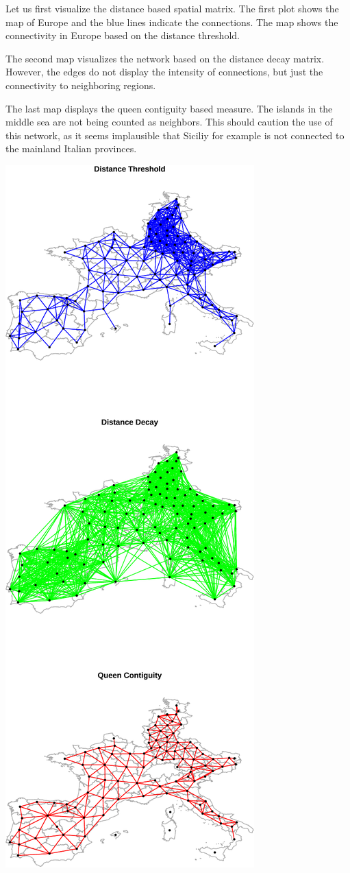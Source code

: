 \documentclass[
  a4paper,
]{article}
\begin{document}
Let us first visualize the distance based spatial matrix. The first plot
shows the map of Europe and the blue lines indicate the connections. The
map shows the connectivity in Europe based on the distance threshold.

The second map visualizes the network based on the distance decay
matrix. However, the edges do not display the intensity of connections,
but just the connectivity to neighboring regions.

The last map displays the queen contiguity based measure. The islands in
the middle sea are not being counted as neighbors. This should caution
the use of this network, as it seems implausible that Siciliy for
example is not connected to the mainland Italian provinces.

\begin{center}\includegraphics{02_assignmnet_files/figure-latex/unnamed-chunk-9-1} \end{center}
\end{document}
